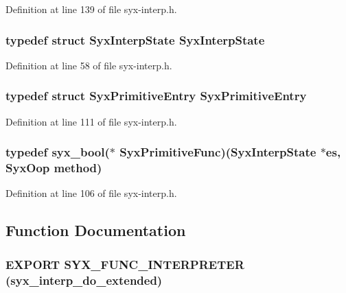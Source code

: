 Definition at line 139 of file syx-interp.h.\hypertarget{syx-interp_8h_c5d43af3b7df53e03c2abec53c7a25c5}{
\subsubsection{\setlength{\rightskip}{0pt plus 5cm}typedef struct {\bf SyxInterpState} {\bf SyxInterpState}}}
\label{syx-interp_8h_c5d43af3b7df53e03c2abec53c7a25c5}




Definition at line 58 of file syx-interp.h.\hypertarget{syx-interp_8h_b335395931e5fbbf25141d208000a91f}{
\subsubsection{\setlength{\rightskip}{0pt plus 5cm}typedef struct {\bf SyxPrimitiveEntry} {\bf SyxPrimitiveEntry}}}
\label{syx-interp_8h_b335395931e5fbbf25141d208000a91f}




Definition at line 111 of file syx-interp.h.\hypertarget{syx-interp_8h_3c7eb85b3ff9105a45f6ff8a4efb6462}{
\subsubsection{\setlength{\rightskip}{0pt plus 5cm}typedef {\bf syx\_\-bool}($\ast$  {\bf SyxPrimitiveFunc})({\bf SyxInterpState} $\ast$es, {\bf SyxOop} method)}}
\label{syx-interp_8h_3c7eb85b3ff9105a45f6ff8a4efb6462}




Definition at line 106 of file syx-interp.h.

\subsection{Function Documentation}
\hypertarget{syx-interp_8h_50f705244d1caf2f54378f234e9c5b1c}{
\subsubsection{\setlength{\rightskip}{0pt plus 5cm}EXPORT SYX\_\-FUNC\_\-INTERPRETER (syx\_\-interp\_\-do\_\-extended)}}
\label{syx-interp_8h_50f705244d1caf2f54378f234e9c5b1c}


